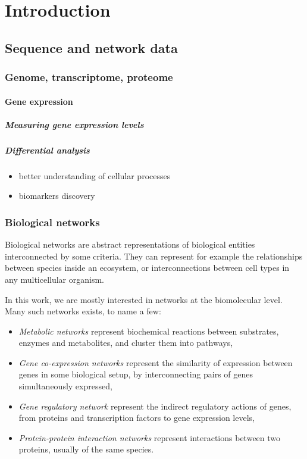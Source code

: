\chapter{Introduction}
\label{chap:prelim}

\section{Sequence and network data}

	\subsection{Genome, transcriptome, proteome}

		\subsubsection{Gene expression}

		\paragraph{Measuring gene expression levels}

		\paragraph{Differential analysis}

			\begin{itemize}
				\item better understanding of cellular processes
				\item biomarkers discovery
			\end{itemize}

	\subsection{Biological networks}
		Biological networks are abstract representations of biological entities interconnected by some criteria.
		They can represent for example the relationships between species inside an ecosystem, or interconnections between cell types in any multicellular organism.

		In this work, we are mostly interested in networks at the biomolecular level.
		Many such networks exists, to name a few:
		\begin{itemize}
			\item \emph{Metabolic networks} represent biochemical reactions between substrates, enzymes and metabolites, and cluster them into pathways,
			\item \emph{Gene co-expression networks} represent the similarity of expression between genes in some biological setup, by interconnecting pairs of genes simultaneously expressed,
			\item \emph{Gene regulatory network} represent the indirect regulatory actions of genes, from proteins and transcription factors to gene expression levels,
			\item \emph{Protein-protein interaction networks} represent interactions between two proteins, usually of the same species.
		\end{itemize}

